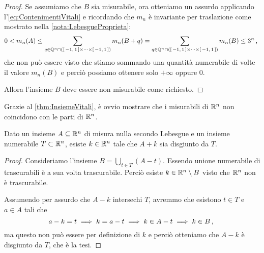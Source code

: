 \begin{proof}
	Se assumiamo che $B$ sia misurabile, ora otteniamo un assurdo applicando l'\cref{eq:ContenimentiVitali} e ricordando che $m_n$ è invariante per traslazione come mostrato nella \cref{nota:LebesgueProprieta}:
	\begin{equation*}
		0<m_n(A)\le \sum_{q\in \mathbb Q^n\cap\left(\left[\,-1,\,1\,\right]\times\cdots \times\left[\,-1,\,1\,\right]\right)} m_n(B+q)=
		\sum_{q\in \mathbb Q^n\cap\left(\left[\,-1,\,1\,\right]\times\cdots \times\left[\,-1,\,1\,\right]\right)} m_n(B) \le 3^n \, \text{, }
	\end{equation*}
	che non può essere visto che stiamo sommando una quantità numerabile di volte il valore $m_n(B)$ e perciò possiamo ottenere solo $+\infty$ oppure $0$.
	
	Allora l'insieme $B$ deve essere non misurabile come richiesto.
\end{proof}
\begin{corollary}\label{cor:MisurabiliNonParti}
	Grazie al \cref{thm:InsiemeVitali}, è ovvio mostrare che i misurabili di $\mathbb R^n$ non coincidono con le parti di $\mathbb R^n$.
\end{corollary}

\begin{exercise}
	Dato un insieme $A\subseteq\mathbb R^n$ di misura nulla secondo Lebesgue e un insieme numerabile $T\subset \mathbb R^n$, esiste $k\in \mathbb R^n$ tale che $A+k$ sia disgiunto da $T$.
\end{exercise}
\begin{proof}
	Consideriamo l'insieme $B=\bigcup_{t\in T} (A-t)$. 
	Essendo unione numerabile di trascurabili è a sua volta trascurabile.
	Perciò esiste $k\in\mathbb R^n\setminus B$ visto che $\mathbb R^n$ non è trascurabile.
	
	Assumendo per assurdo che $A-k$ intersechi $T$, avremmo che esistono $t\in T$ e $a\in A$ tali che
	\begin{equation*}
		a-k=t\implies k=a-t \implies k\in A-t\implies k\in B \, \text{, }
	\end{equation*}
	ma questo non può essere per definizione di $k$ e perciò otteniamo che $A-k$ è disgiunto da $T$, che è la tesi.
\end{proof}

